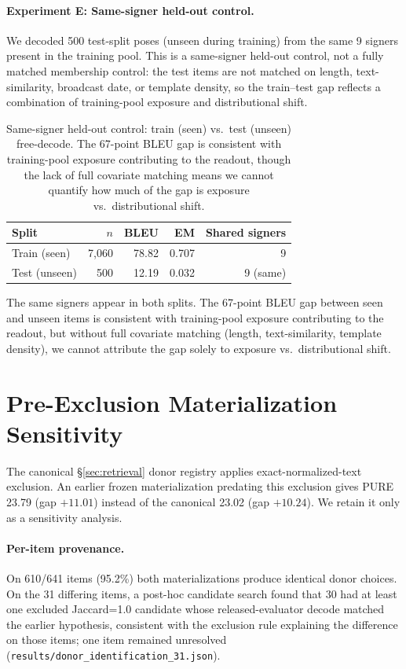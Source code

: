 \documentclass[pdflatex,sn-chicago]{sn-jnl}
\begin{document}
\paragraph{Experiment E: Same-signer held-out control.}
We decoded 500 test-split poses (unseen during training) from the same 9 signers present in the training pool. This is a same-signer held-out control, not a fully matched membership control: the test items are not matched on length, text-similarity, broadcast date, or template density, so the train--test gap reflects a combination of training-pool exposure and distributional shift.
\begin{table}[h]
\centering
\small
\caption{Same-signer held-out control: train (seen) vs.\ test (unseen) free-decode. The 67-point BLEU gap is consistent with training-pool exposure contributing to the readout, though the lack of full covariate matching means we cannot quantify how much of the gap is exposure vs.\ distributional shift.}
\label{tab:membership_control}
\begin{tabular}{lrrrr}
\toprule
Split & $n$ & BLEU & EM & Shared signers \\
\midrule
Train (seen) & 7{,}060 & 78.82 & 0.707 & 9 \\
Test (unseen) & 500 & 12.19 & 0.032 & 9 (same) \\
\bottomrule
\end{tabular}
\end{table}
The same signers appear in both splits. The 67-point BLEU gap between seen and unseen items is consistent with training-pool exposure contributing to the readout, but without full covariate matching (length, text-similarity, template density), we cannot attribute the gap solely to exposure vs.\ distributional shift.

\section{Pre-Exclusion Materialization Sensitivity}
\label{sec:appendix_materialization}
The canonical \S\ref{sec:retrieval} donor registry applies exact-normalized-text exclusion. An earlier frozen materialization predating this exclusion gives PURE 23.79 (gap $+11.01$) instead of the canonical 23.02 (gap $+10.24$). We retain it only as a sensitivity analysis.

\paragraph{Per-item provenance.} On 610/641 items (95.2\%) both materializations produce identical donor choices. On the 31 differing items, a post-hoc candidate search found that 30 had at least one excluded Jaccard=1.0 candidate whose released-evaluator decode matched the earlier hypothesis, consistent with the exclusion rule explaining the difference on those items; one item remained unresolved (\texttt{results/donor\_identification\_31.json}).
\end{document}
